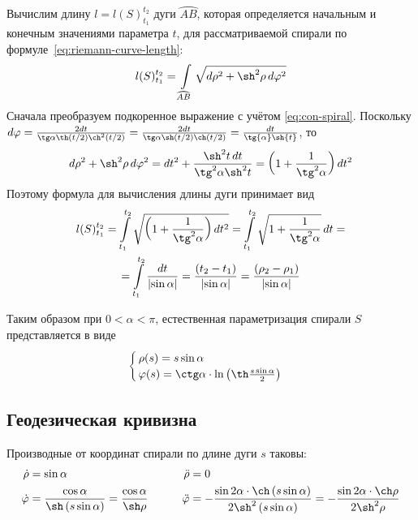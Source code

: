 \documentclass{article}
\numberwithin{equation}{section}
\renewcommand{\phi}{\varphi}
\providecommand{\arc}[1]{\wideparen{#1}}
\providecommand{\abs}[1]{\left \lvert{#1}\right \rvert}
\begin{document}
Вычислим длину $l=l(S)_{t_1}^{t_2}$ дуги $\arc{AB}$, которая
определяется начальным и конечным значениями параметра $t$, для
рассматриваемой спирали по формуле \eqref{eq:riemann-curve-length}:
\begin{equation*}
  l(S)_{t_1}^{t_2} = \int \limits_{\arc{AB}}{\sqrt{d\rho^2+\sh^2\rho\,d\phi^2}}
\end{equation*}
Сначала преобразуем подкоренное выражение с учётом
\eqref{eq:con-spiral}. Поскольку $d\phi = \frac{2 dt}{\tg\alpha
  \th(t/2) \ch^2(t/2)} = \frac{2 dt}{\tg\alpha \sh(t/2)
  \ch(t/2)}=\frac{dt}{\tg{\alpha}\sh{t}}$, то
\begin{equation*}  
  d\rho^2+\sh^2\rho\, d\phi^2 =
  dt^2 + \frac{\sh^2{t}\, dt}{\tg^2{\alpha}\sh^2{t}}
  =\left(1+\frac{1}{\tg^2{\alpha}}\right)dt^2
\end{equation*}
Поэтому формула для вычисления длины дуги принимает вид
\begin{multline}
  l(S)_{t_1}^{t_2} =
  \int \limits_{t_1}^{t_2}\sqrt{\left(1+\frac{1}{\tg^2{\alpha}}\right)dt^2} =
  \int \limits_{t_1}^{t_2}\sqrt{1+\frac{1}{\tg^2{\alpha}}}\,dt = \\
  = \int \limits_{t_1}^{t_2}\frac{dt}{\abs{\sin\alpha}} =
  \frac{(t_2 - t_1)}{\abs{\sin\alpha}} = \frac{(\rho_2 - \rho_1)}{\abs{\sin\alpha}}
\end{multline}

Таким образом при $0 < \alpha < \pi$, естественная параметризация
спирали $S$ представляется в виде
\begin{equation}
  \begin{cases}
    \rho(s) = s \sin\alpha\\
    \phi(s) = \ctg\alpha\cdot\ln\left(\th\frac{s \sin\alpha}{2}\right)
  \end{cases}
\end{equation}

\subsection{Геодезическая кривизна}
Производные от координат спирали по длине дуги $s$ таковы:
\begin{align*}
  \dot{\rho} &= \sin\alpha &\qquad \ddot{\rho} &= 0 \\
  \dot{\phi} &= \frac{\cos\alpha}{\sh\left(s \sin\alpha\right)} = \frac{\cos\alpha}{\sh\rho} &\qquad
  \ddot{\phi} &= -\frac{\sin{2\alpha} \cdot \ch\left(s \sin\alpha\right)}
                      {2 \sh^2\left(s \sin\alpha\right)} =
                      -\frac{\sin{2\alpha} \cdot \ch\rho}{2 \sh^2\rho}
\end{align*}
\end{document}
